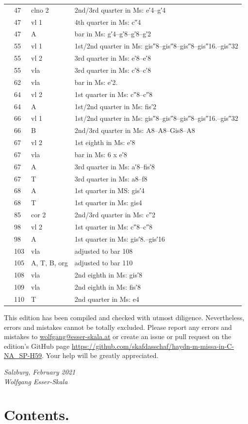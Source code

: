 \documentclass[parskip=full]{scrreprt}
\newif\iftemplate\templatetrue
\begin{document}
\begin{longtable}{lll L{10cm}}
	  & 47   & clno 2  & 2nd/3rd quarter in Ms: e′4–g′4 \\
	  & 47   & vl 1    & 4th quarter in Ms: c″4 \\
	  & 47   & A       & bar in Ms: g′4–g′8–g′8–g′2 \\
	  & 55   & vl 1    & 1st/2nd quarter in Ms: gis″8–gis″8–gis″8–gis″16.–gis″32 \\
	  & 55   & vl 2    & 3rd quarter in Ms: e′8–e′8 \\
	  & 55   & vla     & 3rd quarter in Ms: c′8–c′8 \\
	  & 62   & vla     & bar in Ms: e′2. \\
	  & 64   & vl 2    & 1st quarter in Ms: c″8–c″8 \\
	  & 64   & A       & 1st/2nd quarter in Ms: fis′2 \\
	  & 66   & vl 1    & 1st/2nd quarter in Ms: gis″8–gis″8–gis″8–gis″16.–gis″32 \\
	  & 66   & B       & 2nd/3rd quarter in Ms: A8–A8–Gis8–A8 \\
	  & 67   & vl 2    & 1st eighth in Ms: e′8 \\
	  & 67   & vla     & bar in Ms: 6 x e′8 \\
	  & 67   & A       & 3rd quarter in Ms: a′8–fis′8 \\
	  & 67   & T       & 3rd quarter in Ms: a8–f8 \\
	  & 68   & A       & 1st quarter in MS: gis′4 \\
	  & 68   & T       & 1st quarter in Ms: gis4 \\
	  & 85   & cor 2   & 2nd/3rd quarter in Ms: c″2 \\
	  & 98   & vl 2    & 1st quarter in Ms: c″8–c″8 \\
	  & 98   & A       & 1st quarter in Ms: gis′8.–gis′16 \\
	  & 103  & vla     & adjusted to bar 108 \\
	  & 105  & A, T, B, org & adjusted to bar 110 \\
	  & 108  & vla     & 2nd eighth in Ms: gis′8 \\
	  & 109  & vla     & 2nd eighth in Ms: fis′8 \\
	  & 110  & T       & 2nd quarter in Ms: e4 \\
	\bottomrule
\end{longtable}


This edition has been compiled and checked with utmost diligence. Nevertheless, errors and mistakes cannot be totally excluded. Please report any errors and mistakes to \url{wolfgang@esser-skala.at} or create an issue or pull request on the edition’s GitHub page \url{https://github.com/skafdasschaf/haydn-m-missa-in-C-NA_SP-H59}. Your help will be greatly appreciated.

\bigskip
\textit{Salzburg, February 2021\\
Wolfgang Esser-Skala}

\cleardoublepage
\chapter*{Contents.}




\cleardoublepage
\fi

\iftemplate

\fi
\end{document}
